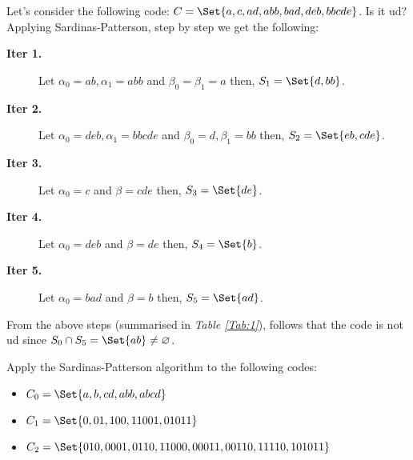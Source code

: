 \documentclass{subfiles}
\begin{document}
    \begin{example*}
        Let's consider the following code: \(C = \Set{a, c, ad, abb, bad, deb,bbcde}\).
        Is it \gls{ud}? Applying Sardinas-Patterson, step by step we get the following:
        \begin{description}
            \item [\textbf{Iter 1. }] Let \(\alpha_{0} = ab, \alpha_{1} = abb\) 
                and \(\beta_{0} = \beta_{1} = a\) then, \(S_{1} = \Set{d, bb}\).
            \item [\textbf{Iter 2. }] Let \(\alpha_{0} = deb, \alpha_{1} = bbcde\)
                and \(\beta_{0} = d, \beta_{1} = bb\) then, \(S_{2} = \Set{eb, cde}\).
            \item [\textbf{Iter 3. }] Let \(\alpha_{0} = c\) and \(\beta = cde\)
                then, \(S_{3} = \Set{de}\). 
            \item [\textbf{Iter 4. }] Let \(\alpha_{0} = deb\) and \(\beta = de\)
                then, \(S_{4} = \Set{b}\). 
            \item [\textbf{Iter 5. }] Let \(\alpha_{0} = bad\) and \(\beta = b\)
                then, \(S_{5} = \Set{ad}\). 
        \end{description}
        
        From the above steps (summarised in \emph{Table \ref{Tab:1}}), 
            follows that the code is not \gls{ud} since \(S_{0} \cap S_{5} =
            \Set{ab} \ne \varnothing\).
    \end{example*}
    \begin{exercise}
        Apply the Sardinas-Patterson algorithm to the following codes:
        \begin{itemize}
            \item \(C_{0} = \Set{a, b, cd, abb, abcd }\) 
            \item \(C_{1} = \Set{0, 01, 100, 11001, 01011}\)
            \item \(C_{2} = \Set{010, 0001, 0110, 11000, 00011, 00110, 11110, 101011}\)
        \end{itemize}
    \end{exercise}
\end{document}
